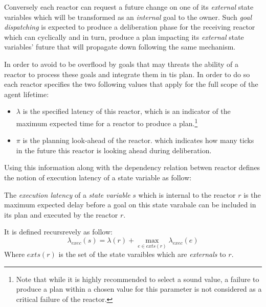 Conversely each reactor can request a future change on one of its {\em
  external} state variables which will be transformed as an {\em
  internal} goal to the owner.  Such \emph{goal dispatching} is
expected to produce a deliberation phase for the receiving reactor
which can cyclically and in turn, produce a plan impacting its {\em
  external} state variables' future that will propagate down following
the same mechanism. 

In order to avoid to be overflood by goals that may threats the
ability of a reactor to process these goals and integrate them in tis
plan. In order to do so each reactor specifies the two following
values that apply for the full scope of the agent lifetime:
\begin{itemize}
\item $\lambda$ is the specified latency of this reactor, which is an
  indicator of the maximum expected time for a reactor to produce a
  plan.\footnote{Note that while it is highly recommended to select a
    sound value, a failure to produce a plan within a chosen value for
    this parameter is not considered as a critical failure of the
    reactor.}
\item $\pi$ is the planning look-ahead of the reactor. which indicates
  how many ticks in the future this reactor is looking ahead during
  deliberation. 
\end{itemize}

Using this information along with the dependency relation betwen
reactor \rx defines the notion of execution latency of a state
variable as follow:
\begin{definition}
  The {\em execution latency}  of a {\em state variable} $s$ which is
    internal to the reactor $r$ is the maximum expected delay before 
    a goal on this state varabale can be included in its plan and
    executed by the  reactor $r$. 

    It is defined recursrevely as follow: 
    \begin{equation*}
      \lambda_{exec}(s) = \lambda(r) + \max_{e \in exts(r)}
      \lambda_{exec}(e) 
  \end{equation*}
    Where  $exts(r)$ is the set of the state varaibles which are
    {\em externals} to $r$. 
\end{definition}

